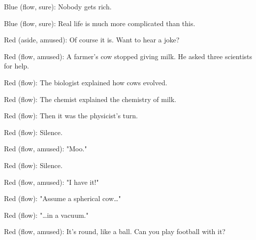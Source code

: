 
Blue (flow, sure): Nobody gets rich.


\label{offer}

Blue (flow, sure): Real life is
much more complicated than this.

Red (aside, amused): Of course it is.
Want to hear a joke?

\label{joke}


Red (flow, amused): A farmer's cow stopped giving milk.
He asked three scientists for help.

Red (flow): The biologist explained how cows evolved.

Red (flow): The chemist explained the chemistry of milk.

Red (flow): Then it was the physicist's turn.

Red (flow): Silence.

Red (flow, amused): "Moo."

Red (flow): Silence.


Red (flow, amused): "I have it!"

Red (flow): "Assume a spherical cow…"

Red (flow): "…in a vacuum."

Red (flow, amused): It's round, like a ball.
Can you play football with it?

